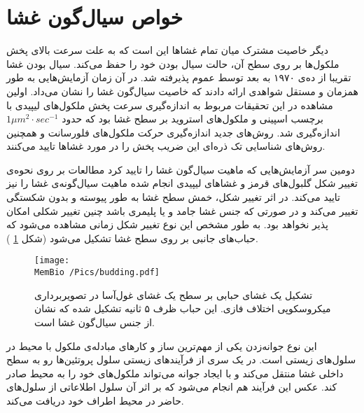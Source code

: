 \setRL
\section{
خواص سیال‌گون غشا
}

دیگر خاصیت مشترک میان تمام غشا‌ها این است که به علت سرعت بالای پخش ملکول‌ها بر روی سطح آن، حالت سیال بودن خود را حفظ می‌کند. سیال بودن غشا تقریبا از ده‌ی ۱۹۷۰ به بعد توسط عموم پذیرفته شد. در آن زمان آزمایش‌هایی به طور همزمان و مستقل شواهدی ارائه دادند که خاصیت سیال‌گون غشا را نشان می‌داد. اولین مشاهده در این تحقیقات مربوط به اندازه‌گیری سرعت پخش ملکول‌های لیپیدی  با برچسب اسپینی
\cite{Kornberg1971DiffusionPhospholipids, Devaux1972LateralDiffusion}
و ملکول‌های استروید
\cite{Sackmann1972, Traeubl1972}
بر سطح غشا بود که حدود 
$1 \mu m^2\cdot sec^{-1}$
اندازه‌گیری شد. روش‌های جدید اندازه‌گیری  حرکت ملکول‌های فلورسانت
\cite{almeida1992lateral}
و همچنین روش‌های شناسایی تک ذره‌ای 
\cite{Sako1994, Saxton1997, Fujiwara2002, Kusumi2005}
این ضریب پخش را در مورد غشاها تایید می‌کنند.

دومین سر آزمایش‌هایی که ماهیت سیال‌گون غشا را تایید کرد  مطالعات بر روی نحوه‌ی تغییر شکل گلبول‌های قرمز 
\cite{Canham1970, Evans1974}
و غشاهای لیپیدی
\cite{Helfrich1973, Helfrich1976}
انجام شده ماهیت سیال‌گونه‌ی غشا را نیز تایید می‌کند. در اثر تغییر شکل، خمش سطح غشا  به طور پیوسته و بدون شکستگی تغییر می‌کند و در صورتی که جنس غشا جامد و یا پلیمری باشد چنین تغییر شکلی امکان پذیر نخواهد بود. به طور مشخص این نوع تغییر شکل زمانی مشاهده می‌شود که حباب‌های جانبی بر روی سطح غشا تشکیل می‌شود (شکل 
\ref{fig:budding}
).

\begin{figure}[h]
\begin{center}
\texttt{[image: \\MemBio /Pics/budding.pdf]}
\caption{
تشکیل یک غشای حبابی بر سطح یک غشای غول‌آسا در تصویربرداری میکروسکوپی اختلاف فازی. این حباب ظرف ۵ ثانیه تشکیل  شده که نشان از جنس سیال‌گون غشا است.
\cite{Dimova2006} 
}
\label{fig:budding}
\end{center}
\end{figure}

این نوع جوانه‌زدن
یکی از مهم‌ترین ساز‌ و کار‌های مبادله‌ی ملکول با محیط در سلول‌های زیستی‌ است. در یک سری از فرآیند‌های زیستی سلول پروتئین‌ها رو به سطح داخلی غشا منتقل می‌کند و با ایجاد جوانه می‌تواند ملکول‌های خود را به محیط صادر کند. عکس این فرآیند هم انجام می‌شود که بر اثر آن سلول اطلاعاتی از سلول‌های حاضر در محیط اطراف خود دریافت می‌کند.






